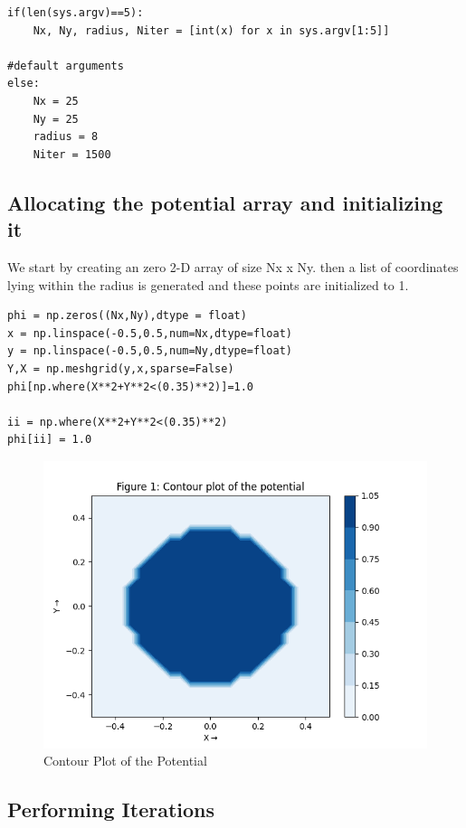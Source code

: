 \documentclass{article}
\begin{document}
\lstset{language=Python}
\lstset{frame=lines}
\lstset{basicstyle=\footnotesize}
\begin{lstlisting}
if(len(sys.argv)==5):
    Nx, Ny, radius, Niter = [int(x) for x in sys.argv[1:5]]

#default arguments
else:
    Nx = 25
    Ny = 25
    radius = 8
    Niter = 1500
\end{lstlisting}

\subsection{Allocating the potential array and initializing it}
We start by creating an zero 2-D array of size Nx x Ny. then a list of coordinates lying within the radius is generated and these points are initialized to 1.
\begin{lstlisting}
phi = np.zeros((Nx,Ny),dtype = float)
x = np.linspace(-0.5,0.5,num=Nx,dtype=float)
y = np.linspace(-0.5,0.5,num=Ny,dtype=float)
Y,X = np.meshgrid(y,x,sparse=False)
phi[np.where(X**2+Y**2<(0.35)**2)]=1.0

ii = np.where(X**2+Y**2<(0.35)**2)
phi[ii] = 1.0
\end{lstlisting}
\begin{figure}[h!]
\centering
\includegraphics[scale=0.6]{1}
\caption{Contour Plot of the Potential}
\label{fig: Contour Plot of the Potential}
\end{figure}


\subsection{Performing Iterations}
\end{document}
